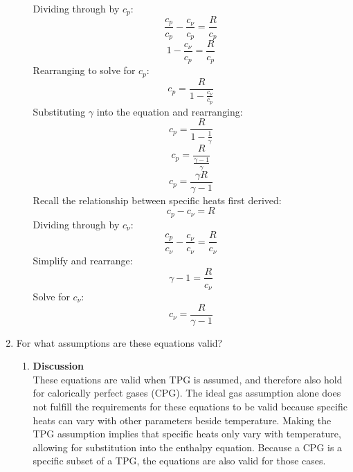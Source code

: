 \documentclass[12pt,letterpaper]{article}
\begin{document}
\begin{enumerate}[label=(\alph*)]
\begin{enumerate}[label=\arabic*.]
			Dividing through by $c_p$:
			\begin{equation*}
				\frac{c_p}{c_p} - \frac{c_{\nu}}{c_p} = \frac{R}{c_p}
			\end{equation*}
			\begin{equation*}
				1 - \frac{c_{\nu}}{c_p} = \frac{R}{c_p}
			\end{equation*}
			Rearranging to solve for $c_p$:
			\begin{equation*}
				c_p = \frac{R}{1-\frac{c_{\nu}}{c_p}}
			\end{equation*}
			Substituting $\gamma$ into the equation and rearranging:
			\begin{equation*}
				c_p = \frac{R}{1-\frac{1}{\gamma}}
			\end{equation*}
			\begin{equation*}
				c_p = \frac{R}{\frac{\gamma-1}{\gamma}}
			\end{equation*}
			\begin{equation*}
				\boxed{c_p = \frac{\gamma R}{\gamma-1}}
			\end{equation*}
			Recall the relationship between specific heats first derived:
			\begin{equation*}
				c_p - c_{\nu} = R
			\end{equation*}
			Dividing through by $c_{\nu}$:
			\begin{equation*}
				\frac{c_p}{c_{\nu}} - \frac{c_{\nu}}{c_\nu} = \frac{R}{c_\nu}
			\end{equation*}
			Simplify and rearrange:
			\begin{equation*}
				\gamma - 1 = \frac{R}{c_\nu}
			\end{equation*}
			Solve for $c_\nu$:
			\begin{equation*}
				\boxed{c_\nu = \frac{R}{\gamma -1}}
			\end{equation*}

		\end{enumerate}
		
		\item For what assumptions are these equations valid?
		\begin{enumerate}[label=\arabic*.]
			\item{\textbf{Discussion}}\\
			These equations are valid when TPG is assumed, and therefore also hold for calorically perfect gases (CPG). The ideal gas assumption alone does not fulfill the requirements for these equations to be valid because specific heats can vary with other parameters beside temperature. Making the TPG assumption implies that specific heats only vary with temperature, allowing for substitution into the enthalpy equation. Because a CPG is a specific subset of a TPG, the equations are also valid for those cases.
		\end{enumerate}
	\end{enumerate}
	\newpage
	
\end{document}
